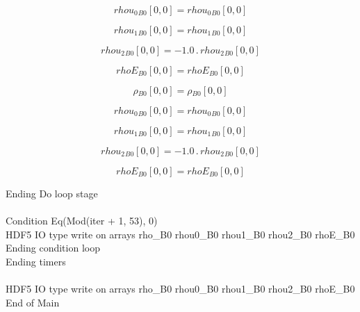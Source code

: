 \documentclass{article}
\begin{document}
\begin{dmath}{rhou_{0}{_{B0}}}[{0,0}] = {rhou_{0}{_{B0}}}[{0,0}]\end{dmath}

\begin{dmath}{rhou_{1}{_{B0}}}[{0,0}] = {rhou_{1}{_{B0}}}[{0,0}]\end{dmath}

\begin{dmath}{rhou_{2}{_{B0}}}[{0,0}] = - 1.0 \,.\, {rhou_{2}{_{B0}}}[{0,0}]\end{dmath}

\begin{dmath}{rhoE{_{B0}}}[{0,0}] = {rhoE{_{B0}}}[{0,0}]\end{dmath}

\begin{dmath}{\rho{_{B0}}}[{0,0}] = {\rho{_{B0}}}[{0,0}]\end{dmath}

\begin{dmath}{rhou_{0}{_{B0}}}[{0,0}] = {rhou_{0}{_{B0}}}[{0,0}]\end{dmath}

\begin{dmath}{rhou_{1}{_{B0}}}[{0,0}] = {rhou_{1}{_{B0}}}[{0,0}]\end{dmath}

\begin{dmath}{rhou_{2}{_{B0}}}[{0,0}] = - 1.0 \,.\, {rhou_{2}{_{B0}}}[{0,0}]\end{dmath}

\begin{dmath}{rhoE{_{B0}}}[{0,0}] = {rhoE{_{B0}}}[{0,0}]\end{dmath}

\noindent Ending Do loop stage\\
\\\noindent Condition Eq(Mod(iter + 1, 53), 0)\\\noindent HDF5 IO type write on arrays rho_B0 rhou0_B0 rhou1_B0 rhou2_B0 rhoE_B0\\\noindent Ending condition loop %
\\\noindent Ending timers\\
\\\noindent HDF5 IO type write on arrays rho_B0 rhou0_B0 rhou1_B0 rhou2_B0 rhoE_B0\\\noindent End of Main\\
\end{document}
